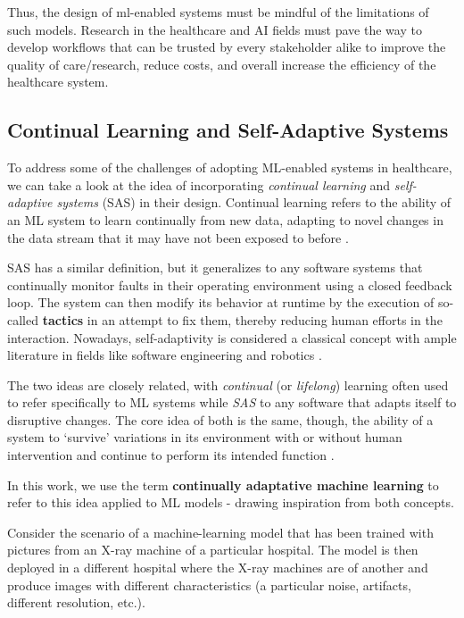 \documentclass[../main.tex]{subfiles}
\begin{document}
    Thus, the design of ml-enabled systems must be mindful of the limitations of such models. Research in the healthcare and AI fields must pave the way to develop workflows that can be trusted by every stakeholder alike to improve the quality of care/research, reduce costs, and overall increase the efficiency of the healthcare system.


    \subsection{Continual Learning and Self-Adaptive Systems} \label{sec:lifelong_adaptive_systems}

    To address some of the challenges of adopting ML-enabled systems in healthcare, we can take a look at the idea of incorporating \textit{continual learning} and \textit{self-adaptive systems} (SAS) in their design. Continual learning refers to the ability of an ML system to learn continually from new data, adapting to novel changes in the data stream that it may have not been exposed to before \cite{parisi_continual_2019}. 
    
    SAS has a similar definition, but it generalizes to any software systems that continually monitor faults in their operating environment using a closed feedback loop. The system can then modify its behavior at runtime by the execution of so-called \textbf{tactics} in an attempt to fix them, thereby reducing human efforts in the interaction. Nowadays, self-adaptivity is considered a classical concept with ample literature in fields like software engineering and robotics \cite{macias-escrivaSelfadaptiveSystemsSurvey2013,gheibiApplyingMachineLearning2020,casimiro_self-adaptive_2022}.

    \clearpage
    
    The two ideas are closely related, with \textit{continual} (or \textit{lifelong}) learning often used to refer specifically to ML systems while \textit{SAS} to any software that adapts itself to disruptive changes. The core idea of both is the same, though, the ability of a system to `survive' variations in its environment with or without human intervention and continue to perform its intended function \cite{macias-escrivaSelfadaptiveSystemsSurvey2013}. 
    
    In this work, we use the term \textbf{continually adaptative machine learning} to refer to this idea applied to ML models - drawing inspiration from both concepts. 

    Consider the scenario of a machine-learning model that has been trained with pictures from an X-ray machine of a particular hospital. The model is then deployed in a different hospital where the X-ray machines are of another and produce images with different characteristics (a particular noise, artifacts, different resolution, etc.). 
    
\end{document}
